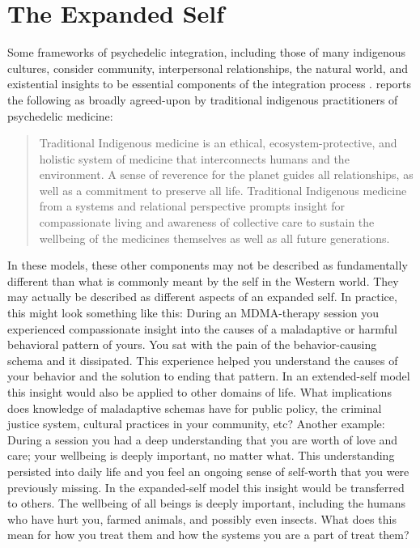 \documentclass[12pt,letterpaper]{book}
\begin{document}
\section{The Expanded Self}
Some frameworks of psychedelic integration, including those of many indigenous cultures, consider community, interpersonal relationships, the natural world, and existential insights to be essential components of the integration process \cite{bathje2022Integration}. \textcite{celidwen2023Indigenous} reports the following as broadly agreed-upon by traditional indigenous practitioners of psychedelic medicine:
\begin{quotation}
    Traditional Indigenous medicine is an ethical, ecosystem-protective, and holistic system of medicine that interconnects humans and the environment. A sense of reverence for the planet guides all relationships, as well as a commitment to preserve all life. Traditional Indigenous medicine from a systems and relational perspective prompts insight for compassionate living and awareness of collective care to sustain the wellbeing of the medicines themselves as well as all future generations.
\end{quotation}
In these models, these other components may not be described as fundamentally different than what is commonly meant by the self in the Western world. They may actually be described as different aspects of an expanded self. In practice, this might look something like this: During an MDMA-therapy session you experienced compassionate insight into the causes of a maladaptive or harmful behavioral pattern of yours. You sat with the pain of the behavior-causing schema and it dissipated. This experience helped you understand the causes of your behavior and the solution to ending that pattern. In an extended-self model this insight would also be applied to other domains of life. What implications does knowledge of maladaptive schemas have for public policy, the criminal justice system, cultural practices in your community, etc? Another example: During a session you had a deep understanding that you are worth of love and care; your wellbeing is deeply important, no matter what. This understanding persisted into daily life and you feel an ongoing sense of self-worth that you were previously missing. In the expanded-self model this insight would be transferred to others. The wellbeing of all beings is deeply important, including the humans who have hurt you, farmed animals, and possibly even insects. What does this mean for how you treat them and how the systems you are a part of treat them?
\end{document}
